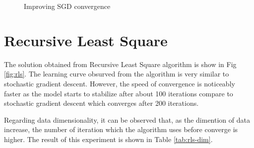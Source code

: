 \documentclass{article}
\begin{document}
\begin{figure}[H]
    \centering
    \qquad
    \caption{Improving SGD convergence}%
    \label{fig:sgd-improve}%
\end{figure}

\section{Recursive Least Square}

The solution obtained from Recursive Least Square algorithm is show in Fig \ref{fig:rls}. The learning curve obsurved from the algorithm is very similar to stochastic gradient descent. However, the speed of convergence is noticeably faster as the model starts to stabilize after about 100 iterations compare to stochastic gradient descent which converges after 200 iterations.

Regarding data dimensionality, it can be observed that, as the dimention of data increase, the number of iteration which the algorithm uses before converge is higher. The result of this experiment is shown in Table \ref{tab:rls-dim}.
\end{document}
